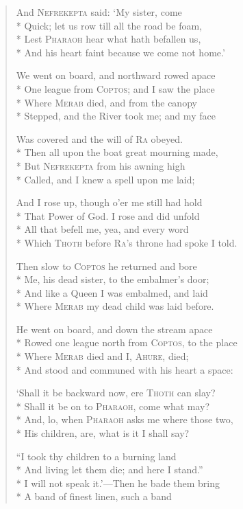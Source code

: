 \documentclass[12pt]{article}
\newcommand{\vin}{\hspace{1em}}
\begin{document}
\begin{verse}
And \textsc{Nefrekepta} said: `My sister, come\\*
Quick; let us row till all the road be foam,\\*
\vin Lest \textsc{Pharaoh} hear what hath befallen us,\\*
And his heart faint because we come not home.'

We went on board, and northward rowed apace\\*
One league from \textsc{Coptos}; and I saw the place\\*
\vin Where \textsc{Merab} died, and from the canopy\\*
Stepped, and the River took me; and my face

Was covered and the will of \textsc{Ra} obeyed.\\*
Then all upon the boat great mourning made,\\*
\vin But \textsc{Nefrekepta} from his awning high\\*
Called, and I knew a spell upon me laid;

And I rose up, though o'er me still had hold\\*
That Power of God. I rose and did unfold\\*
\vin All that befell me, yea, and every word\\*
Which \textsc{Thoth} before \textsc{Ra}'s throne had spoke I told.

Then slow to \textsc{Coptos} he returned and bore\\*
Me, his dead sister, to the embalmer's door;\\*
\vin And like a Queen I was embalmed, and laid\\*
Where \textsc{Merab} my dead child was laid before.

He went on board, and down the stream apace\\*
Rowed one league north from \textsc{Coptos}, to the place\\*
\vin Where \textsc{Merab} died and I, \textsc{Ahure}, died;\\*
And stood and communed with his heart a space:

`Shall it be backward now, ere \textsc{Thoth} can slay?\\*
Shall it be on to \textsc{Pharaoh}, come what may?\\*
\vin And, lo, when \textsc{Pharaoh} asks me where those two,\\*
His children, are, what is it I shall say?

``I took thy children to a burning land\\*
And living let them die; and here I stand.''\\*
\vin I will not speak it.'---Then he bade them bring\\*
A band of finest linen, such a band


\end{verse}
\end{document}
